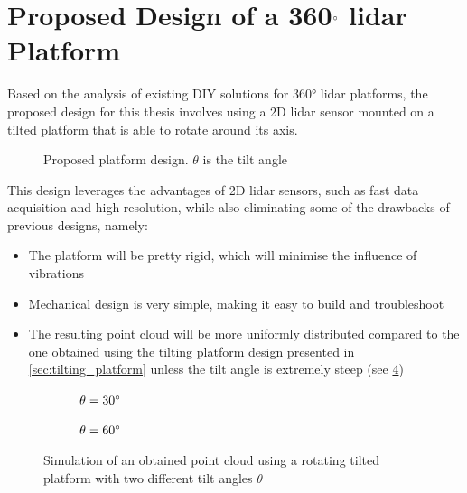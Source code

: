 \section{Proposed Design of a 360$\degree$ \gls{lidar} Platform}
\label{sec:proposed_design}
Based on the analysis of existing DIY solutions for 360° \gls{lidar} platforms, the proposed design for this thesis involves using a 2D \gls{lidar} sensor mounted on a tilted platform that is able to rotate around its axis.
\begin{figure}[H]
    \caption{Proposed platform design. \protect$\theta$ is the tilt angle}
    
    \label{fig:tikz_platform}
\end{figure}
This design leverages the advantages of 2D \gls{lidar} sensors, such as fast data acquisition and high resolution, while also eliminating some of the drawbacks of previous designs, namely:
\begin{itemize}[label=\textcolor{green!60!black}{\textbf{+}}]
    \item The platform will be pretty rigid, which will minimise the influence of vibrations
    \item Mechanical design is very simple, making it easy to build and troubleshoot
    \item The resulting point cloud will be more uniformly distributed compared to the one obtained using the tilting platform design presented in \cref{sec:tilting_platform} unless the tilt angle is extremely steep (see \cref{fig:rotate_pointCloud})
\end{itemize}
\begin{figure}[h!]
    \centering
    
    \begin{subfigure}{0.45\linewidth}
        \centering
        
        \caption{$\theta=30\degree$}
        \label{fig:rotate_pointCloud:30}
    \end{subfigure}
    \hfill
    \begin{subfigure}{0.45\linewidth}
        \centering
        
        \caption{$\theta=60\degree$}
        \label{fig:rotate_pointCloud:60}
    \end{subfigure}

    \caption{Simulation of an obtained point cloud using a rotating tilted platform with two different tilt angles $\theta$}
    \label{fig:rotate_pointCloud}
\end{figure}

